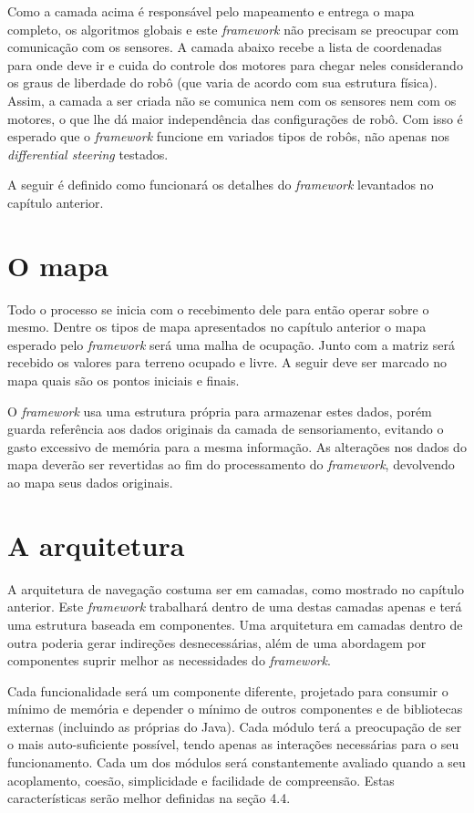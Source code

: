 Como a camada acima é responsável pelo mapeamento e entrega o mapa completo, os algoritmos globais e este \textit{framework} não precisam se preocupar com comunicação com os sensores. A camada abaixo recebe a lista de coordenadas para onde deve ir e cuida do controle dos motores para chegar neles considerando os graus de liberdade do robô (que varia de acordo com sua estrutura física). Assim, a camada a ser criada não se comunica nem com os sensores nem com os motores, o que lhe dá maior independência das configurações de robô. Com isso é esperado que o \textit{framework} funcione em variados tipos de robôs, não apenas nos \textit{differential steering} testados.

A seguir é definido como funcionará os detalhes do \textit{framework} levantados no capítulo anterior.

\section{O mapa}

Todo o processo se inicia com o recebimento dele para então operar sobre o mesmo. Dentre os tipos de mapa apresentados no capítulo anterior o mapa esperado pelo \textit{framework} será uma malha de ocupação. Junto com a matriz será recebido os valores para terreno ocupado e livre. A seguir deve ser marcado no mapa quais são os pontos iniciais e finais.

O \textit{framework} usa uma estrutura própria para armazenar estes dados, porém guarda referência aos dados originais da camada de sensoriamento, evitando o gasto excessivo de memória para a mesma informação. As alterações nos dados do mapa deverão ser revertidas ao fim do processamento do \textit{framework}, devolvendo ao mapa seus dados originais.

\section{A arquitetura}

A arquitetura de navegação costuma ser em camadas, como mostrado no capítulo anterior. Este \textit{framework} trabalhará dentro de uma destas camadas apenas e terá uma estrutura baseada em componentes. Uma arquitetura em camadas dentro de outra poderia gerar indireções desnecessárias, além de uma abordagem por componentes suprir melhor as necessidades do \textit{framework}.

Cada funcionalidade será um componente diferente, projetado para consumir o mínimo de memória e depender o mínimo de outros componentes e de bibliotecas externas (incluindo as próprias do Java). Cada módulo terá a preocupação de ser o mais auto-suficiente possível, tendo apenas as interações necessárias para o seu funcionamento. Cada um dos módulos será constantemente avaliado quando a seu acoplamento, coesão,  simplicidade e facilidade de compreensão. Estas características serão melhor definidas na seção 4.4.

